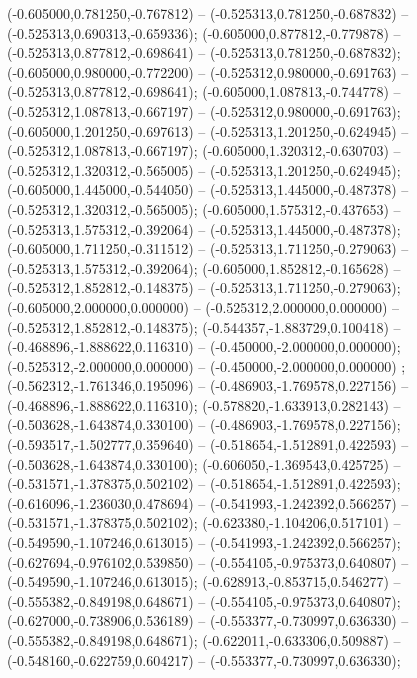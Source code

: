  (-0.605000,0.781250,-0.767812) -- (-0.525313,0.781250,-0.687832) -- (-0.525313,0.690313,-0.659336);
 (-0.605000,0.877812,-0.779878) -- (-0.525313,0.877812,-0.698641) -- (-0.525313,0.781250,-0.687832);
 (-0.605000,0.980000,-0.772200) -- (-0.525312,0.980000,-0.691763) -- (-0.525313,0.877812,-0.698641);
 (-0.605000,1.087813,-0.744778) -- (-0.525312,1.087813,-0.667197) -- (-0.525312,0.980000,-0.691763);
 (-0.605000,1.201250,-0.697613) -- (-0.525313,1.201250,-0.624945) -- (-0.525312,1.087813,-0.667197);
 (-0.605000,1.320312,-0.630703) -- (-0.525312,1.320312,-0.565005) -- (-0.525313,1.201250,-0.624945);
 (-0.605000,1.445000,-0.544050) -- (-0.525313,1.445000,-0.487378) -- (-0.525312,1.320312,-0.565005);
 (-0.605000,1.575312,-0.437653) -- (-0.525313,1.575312,-0.392064) -- (-0.525313,1.445000,-0.487378);
 (-0.605000,1.711250,-0.311512) -- (-0.525313,1.711250,-0.279063) -- (-0.525313,1.575312,-0.392064);
 (-0.605000,1.852812,-0.165628) -- (-0.525312,1.852812,-0.148375) -- (-0.525313,1.711250,-0.279063);
 (-0.605000,2.000000,0.000000) -- (-0.525312,2.000000,0.000000) -- (-0.525312,1.852812,-0.148375);
 (-0.544357,-1.883729,0.100418) -- (-0.468896,-1.888622,0.116310) -- (-0.450000,-2.000000,0.000000);
 (-0.525312,-2.000000,0.000000) -- (-0.450000,-2.000000,0.000000) ;
 (-0.562312,-1.761346,0.195096) -- (-0.486903,-1.769578,0.227156) -- (-0.468896,-1.888622,0.116310);
 (-0.578820,-1.633913,0.282143) -- (-0.503628,-1.643874,0.330100) -- (-0.486903,-1.769578,0.227156);
 (-0.593517,-1.502777,0.359640) -- (-0.518654,-1.512891,0.422593) -- (-0.503628,-1.643874,0.330100);
 (-0.606050,-1.369543,0.425725) -- (-0.531571,-1.378375,0.502102) -- (-0.518654,-1.512891,0.422593);
 (-0.616096,-1.236030,0.478694) -- (-0.541993,-1.242392,0.566257) -- (-0.531571,-1.378375,0.502102);
 (-0.623380,-1.104206,0.517101) -- (-0.549590,-1.107246,0.613015) -- (-0.541993,-1.242392,0.566257);
 (-0.627694,-0.976102,0.539850) -- (-0.554105,-0.975373,0.640807) -- (-0.549590,-1.107246,0.613015);
 (-0.628913,-0.853715,0.546277) -- (-0.555382,-0.849198,0.648671) -- (-0.554105,-0.975373,0.640807);
 (-0.627000,-0.738906,0.536189) -- (-0.553377,-0.730997,0.636330) -- (-0.555382,-0.849198,0.648671);
 (-0.622011,-0.633306,0.509887) -- (-0.548160,-0.622759,0.604217) -- (-0.553377,-0.730997,0.636330);
